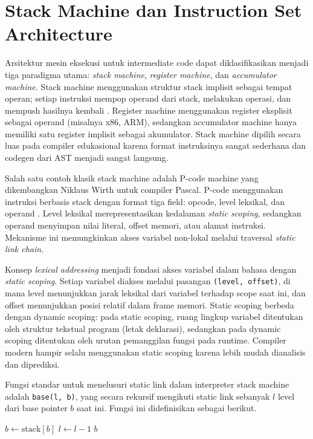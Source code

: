 \section{Stack Machine dan Instruction Set Architecture}

Arsitektur mesin eksekusi untuk intermediate code dapat diklasifikasikan menjadi tiga paradigma utama: \textit{stack machine}, \textit{register machine}, dan \textit{accumulator machine}. Stack machine menggunakan struktur stack implisit sebagai tempat operan; setiap instruksi mempop operand dari stack, melakukan operasi, dan mempush hasilnya kembali \cite{wirth1976algorithms}. Register machine menggunakan register eksplisit sebagai operand (misalnya x86, ARM), sedangkan accumulator machine hanya memiliki satu register implisit sebagai akumulator. Stack machine dipilih secara luas pada compiler edukasional karena format instruksinya sangat sederhana dan codegen dari AST menjadi sangat langsung.

Salah satu contoh klasik stack machine adalah P-code machine yang dikembangkan Niklaus Wirth untuk compiler Pascal. P-code menggunakan instruksi berbasis stack dengan format tiga field: opcode, level leksikal, dan operand \cite{wirth1976algorithms}. Level leksikal merepresentasikan kedalaman \textit{static scoping}, sedangkan operand menyimpan nilai literal, offset memori, atau alamat instruksi. Mekanisme ini memungkinkan akses variabel non-lokal melalui traversal \textit{static link chain}.

Konsep \textit{lexical addressing} menjadi fondasi akses variabel dalam bahasa dengan \textit{static scoping}. Setiap variabel diakses melalui pasangan \texttt{(level, offset)}, di mana level menunjukkan jarak leksikal dari variabel terhadap scope saat ini, dan offset menunjukkan posisi relatif dalam frame memori. Static scoping berbeda dengan dynamic scoping: pada static scoping, ruang lingkup variabel ditentukan oleh struktur tekstual program (letak deklarasi), sedangkan pada dynamic scoping ditentukan oleh urutan pemanggilan fungsi pada runtime. Compiler modern hampir selalu menggunakan static scoping karena lebih mudah dianalisis dan diprediksi.

Fungsi standar untuk menelusuri static link dalam interpreter stack machine adalah \texttt{base(l, b)}, yang secara rekursif mengikuti static link sebanyak $l$ level dari base pointer $b$ saat ini. Fungsi ini didefinisikan sebagai berikut.

\begin{breakablealgorithm}
    \label{alg:base-func}
    \begin{algorithmic}[1]
            \State $b \gets \text{stack}[b]$ 
            \State $l \gets l - 1$
        \EndWhile
        \State \Return $b$
        \EndFunction
    \end{algorithmic}
\end{breakablealgorithm}

